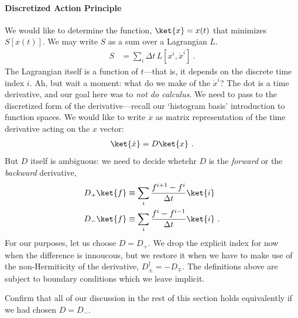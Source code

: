 \paragraph{Discretized Action Principle}
We would like to determine the function, $\ket{x}=x(t)$ that minimizes $S[x(t)]$. We may write $S$ as a sum over a Lagrangian $L$. 
\begin{align}
    S &= \sum_i \Delta t \, L[x^i, \dot x^i]  \ .
\end{align}
The Lagrangian itself is a function of $t$---that is, it depends on the discrete time index $i$.
Ah, but wait a moment: what do we make of the $\dot x^i$? The dot is a time derivative, and our goal here was to \emph{not do calculus}. We need to pass to the discretized form of the derivative---recall our `histogram basis' introduction to function spaces. We would like to write $\dot x$ as matrix representation of the time derivative acting on the $x$ vector:
\begin{align}
    \ket{\dot{x}} = D\ket{x} \ .
\end{align}
But $D$ itself is ambiguous: we need to decide whetehr $D$ is the \emph{forward} or the \emph{backward} derivative,
\begin{align}
    D_+ \ket{f} 
    &\equiv \sum_i \frac{ f^{i+1} - f^i }{\Delta t} \ket{i}
    \\
    D_- \ket{f} 
    &\equiv \sum_i \frac{ f^{i} - f^{i-1} }{\Delta t} \ket{i} \ .
\end{align}
For our purposes, let us choose $D=D_+$. We drop the explicit index for now when the difference is innoucous, but we restore it when we have to make use of the non-Hermiticity of the derivative, $D_\pm^\dag = - D_\mp$. The definitions above are subject to boundary conditions which we leave implicit. 
\begin{exercise}
Confirm that all of our discussion in the rest of this section holds equivalently if we had chosen $D=D_-$.
\end{exercise}

